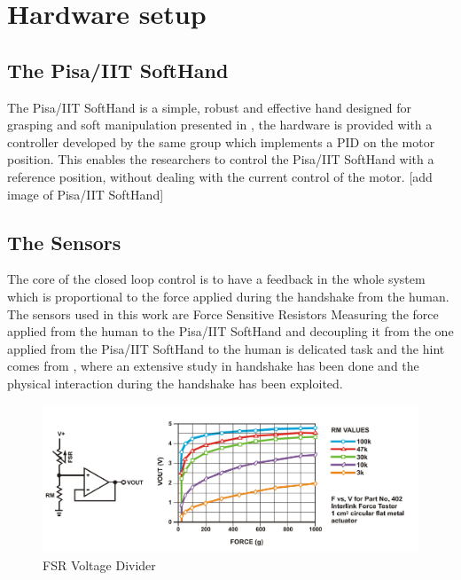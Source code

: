 \chapter{Hardware setup}
\section{The Pisa/IIT SoftHand}
The Pisa/IIT SoftHand is a simple, robust and effective hand designed for grasping and soft manipulation presented in \cite{catalanopisa}, the hardware is provided with a controller developed by the same group which implements a PID on the motor position. This enables the researchers to control the Pisa/IIT SoftHand with a reference position, without dealing with the current control of the motor.
[add image of Pisa/IIT SoftHand]


\section{The Sensors}
The core of the closed loop control is to have a feedback in the whole system which is proportional to the force applied during the handshake from the human. 
The sensors used in this work are Force Sensitive Resistors 
Measuring the force applied from the human to the Pisa/IIT SoftHand and decoupling it from the one applied from the Pisa/IIT SoftHand to the human is delicated task and the hint comes from \cite{espen}, where an extensive study in handshake has been done and the physical interaction during the handshake has been exploited.
\begin{figure}
\centering
\includegraphics[width=\textwidth]{Figure/fsr.png}
\caption{FSR Voltage Divider}
\label{Fig:FSRcircuit}
\end{figure}


